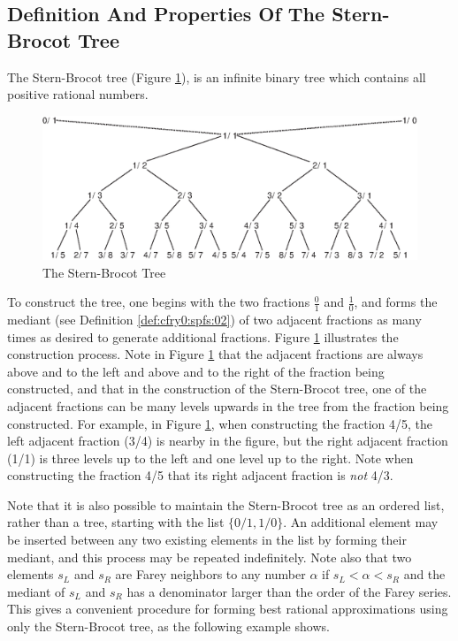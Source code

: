 \subsection{Definition And Properties Of The Stern-Brocot Tree}
\label{ccfr0:ssbt0:sdpt0}

The Stern-Brocot tree 
(Figure \ref{fig:ccfr0:ssbt0:sdpt0:00}), is 
an infinite binary tree which contains all positive rational numbers.

\begin{figure}
\centering
\includegraphics[width=4.6in]{c_cfr0/sbtdpt01.eps}
\caption{The Stern-Brocot Tree}
\label{fig:ccfr0:ssbt0:sdpt0:00}
\end{figure}

To construct the tree, one begins with the two fractions $\frac{0}{1}$
and $\frac{1}{0}$, and forms the mediant (see Definition 
\cfryzeroxrefhyphen{}\ref{def:cfry0:spfs:02})
of two adjacent fractions as many
times as desired to generate additional fractions.
Figure \ref{fig:ccfr0:ssbt0:sdpt0:00} illustrates the construction process.
Note in Figure \ref{fig:ccfr0:ssbt0:sdpt0:00} that the adjacent fractions
are always above and to the left and above and to the right of the fraction
being constructed, and that in the construction of the Stern-Brocot
tree, one of the adjacent fractions can be many levels upwards in the tree
from the fraction being constructed.  For example, in 
Figure \ref{fig:ccfr0:ssbt0:sdpt0:00}, when constructing the fraction 
4/5, the left adjacent fraction (3/4) is nearby in the figure, but 
the right adjacent fraction (1/1) is three levels up to the left and
one level up to the right.  Note when constructing the fraction 4/5 that
its right adjacent fraction is \emph{not} 4/3.

Note that it is also possible to maintain the Stern-Brocot tree as an
ordered list, rather than a tree, starting with the list
$\{0/1, 1/0\}$.  An additional element may be inserted
between any two existing elements in the list by forming their mediant,
and this process may be repeated indefinitely.  Note also that two 
elements $s_L$ and $s_R$ are Farey neighbors to any number $\alpha$
if $s_L < \alpha < s_R$ and the mediant of $s_L$ and $s_R$ has a
denominator larger than the order of the Farey series.  This gives a convenient
procedure for forming best rational approximations using only the Stern-Brocot
tree, as the following example shows.


